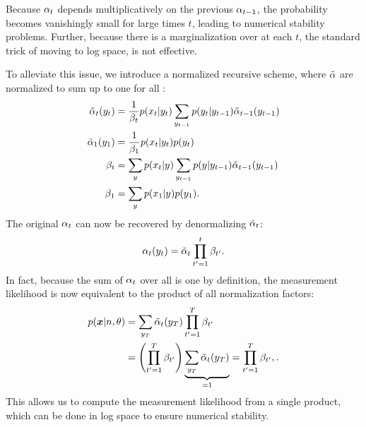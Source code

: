 Because $\alpha_{t}$ depends multiplicatively on the previous $\alpha_{t-1}$,
the probability becomes vanishingly small for large times $t$, leading to
numerical stability problems. Further, because there is a marginalization over
\states at each $t$, the standard trick of moving to log space, is not
effective.

To alleviate this issue, we introduce a normalized recursive scheme, where
$\tilde{\alpha}$ are normalized to sum up to one for all \y{}:
%
\begin{align*}
  \tilde{\alpha}_t(y_{t}) &=
    \frac{1}{\beta_t}
    p(x_{t}|y_{t})
    \sum_{y_{t-1}}
      p(y_{t} | y_{t-1})
      \tilde{\alpha}_{t-1}(y_{t-1})\\
  \tilde{\alpha}_{1}(y_{1}) &=
    \frac{1}{\beta_1}
    p(x_{t}|y_{t})
    p(y_{t})\\
  \beta_t &=
    \sum_{y_{}}
    p(x_{t}|y_{})
    \sum_{y_{t-1}}
      p(y_{} | y_{t-1})
      \tilde{\alpha}_{t-1}(y_{t-1})\\
  \beta_1 &=
    \sum_{y_{}}
    p(x_{1}|y_{})
    p(y_{1})  \text{.}\\
\end{align*}
%
The original $\alpha_{t}$ can now be recovered by denormalizing $\tilde{\alpha}_{t}$:
%
\begin{equation*}
  \alpha_t(y_{t}) = \tilde{\alpha}_t \prod_{t'=1}^t \beta_{t'}
  \text{.}
\end{equation*}
%
In fact, because the sum of $\alpha_{t}$ over all  is one by definition, the measurement likelihood is now equivalent to the product of all normalization factors:
%
\begin{align*}
  p(\bm{x}|n,\theta)
    &= \sum_{y_{T}} \tilde{\alpha}_{t}(y_{T}) \prod_{t'=1}^T \beta_{t'}\\
    &= \left( \prod_{t'=1}^T \beta_{t'} \right)
      \underbrace{\sum_{y_{T}} \tilde{\alpha}_{t}(y_{T})}_{=1}
    = \prod_{t'=1}^T \beta_{t'} ,\text{.}\\
\end{align*}
%
This allows us to compute the measurement likelihood from a single product,
which can be done in log space to ensure numerical stability.
